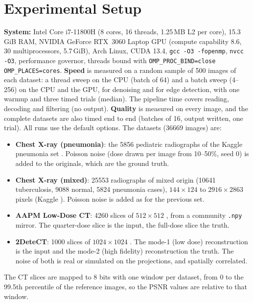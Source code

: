 \documentclass[10pt,a4paper]{article}
\begin{document}
\section{Experimental Setup}
\textbf{System:} Intel Core i7-11800H (8 cores, 16 threads, 1.25\,MB L2 per core), 15.3\,GiB RAM, NVIDIA GeForce RTX~3060
Laptop GPU (compute capability 8.6, 30 multiprocessors, 5.7\,GiB), Arch Linux, CUDA 13.4, \texttt{gcc -O3 -fopenmp},
\texttt{nvcc -O3}, performance governor, threads bound with \texttt{OMP\_PROC\_BIND=close OMP\_PLACES=cores}.
\textbf{Speed} is measured on a random sample of 500 images of each dataset: a thread sweep on the CPU (batch of 64) and
a batch sweep (4--256) on the CPU and the GPU, for denoising and for edge detection, with one warmup and three timed trials
(median). The pipeline time covers reading, decoding and filtering (no output). \textbf{Quality} is measured on every image,
and the complete datasets are also timed end to end (batches of 16, output written, one trial). All runs use the default options. The datasets (\num{36669} images) are:

\begin{itemize}
	\item \textbf{Chest X-ray (pneumonia)}: the \num{5856} pediatric radiographs of the Kaggle pneumonia set
	      \cite{kermany18}. Poisson noise (dose drawn per image from 10--50\%, seed 0) is added to the originals, which are the ground truth.
	\item \textbf{Chest X-ray (mixed)}: \num{25553} radiographs of mixed origin (\num{10641} tuberculosis,
	      \num{9088} normal, \num{5824} pneumonia cases), $144\times124$ to $2916\times2863$ pixels (Kaggle
	      \cite{kagglecxr}). Poisson noise is added as for the previous set.
	\item \textbf{AAPM Low-Dose CT}: \num{4260} slices of $512\times512$ \cite{mccollough17}, from a community \texttt{.npy} mirror. The quarter-dose
	      slice is the input, the full-dose slice the truth.
	\item \textbf{2DeteCT}: \num{1000} slices of $1024\times1024$ \cite{kiss23}. The mode-1 (low dose)
	      reconstruction is the input and the mode-2 (high fidelity) reconstruction the truth. The noise of
	      both is real or simulated on the projections, and spatially correlated.
\end{itemize}
The CT slices are mapped to 8 bits with one window per dataset, from 0 to the 99.5th percentile of the reference images, so the PSNR values are relative to that window.
\end{document}
